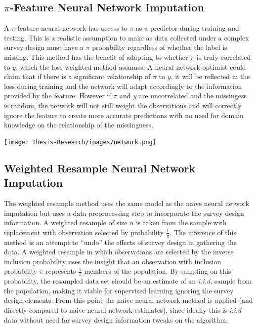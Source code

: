 \documentclass[12pt,twoside]{reedthesis}
\begin{document}
\subsection{\texorpdfstring{\(\pi\)-Feature Neural Network
Imputation}{\textbackslash{}pi-Feature Neural Network Imputation}}\label{pi-feature-neural-network-imputation}

A \(\pi\)-feature neural network has access to \(\pi\) as a predictor
during training and testing. This is a realistic assumption to make as
data collected under a complex survey design must have a \(\pi\)
probability regardless of whether the label is missing. This method has
the benefit of adapting to whether \(\pi\) is truly correlated to \(y\),
which the loss-weighted method assumes. A neural network optimist could
claim that if there is a significant relationship of \(\pi\) to \(y\),
it will be reflected in the loss during training and the network will
adapt accordingly to the information provided by the feature. However if
\(\pi\) and \(y\) are uncorrelated and the missingess is random, the
network will not still weight the observations and will correctly ignore
the feature to create more accurate predictions with no need for domain
knowledge on the relationship of the missingness.

\texttt{[image: Thesis-Research/images/network.png]}

\subsection{Weighted Resample Neural Network
Imputation}\label{weighted-resample-neural-network-imputation}

The weighted resample method uses the same model as the naive neural
network imputation but uses a data preprocessing step to incorporate the
survey design information. A weighted resample of size \(n\) is taken
from the sample with replacement with observation selected by
probability \(\frac{1}{\pi}\). The inference of this method is an
attempt to ``undo'' the effects of survey design in gathering the data.
A weighted resample in which observations are selected by the inverse
inclusion probability uses the insight that an observation with
inclusion probability \(\pi\) represents \(\frac{1}{\pi}\) members of
the population. By sampling on this probability, the resampled data set
should be an estimate of an \emph{i.i.d.} sample from the population,
making it viable for supervised learning ignoring the survey design
elements. From this point the naive neural network method is applied
(and directly compared to naive neural network estimates), since ideally
this is \emph{i.i.d} data without need for survey design information
tweaks on the algorithm.
\end{document}
